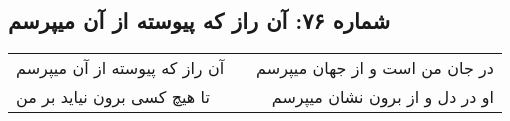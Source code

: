 \begin{center}
\section*{شماره ۷۶: آن راز که پیوسته از آن میپرسم}
\label{sec:076}
\begin{longtable}{l p{0.5cm} r}
آن راز که پیوسته از آن میپرسم
&&
در جان من است و از جهان میپرسم
\\
تا هیچ کسی برون نیاید بر من
&&
او در دل و از برون نشان میپرسم
\\
\end{longtable}
\end{center}
